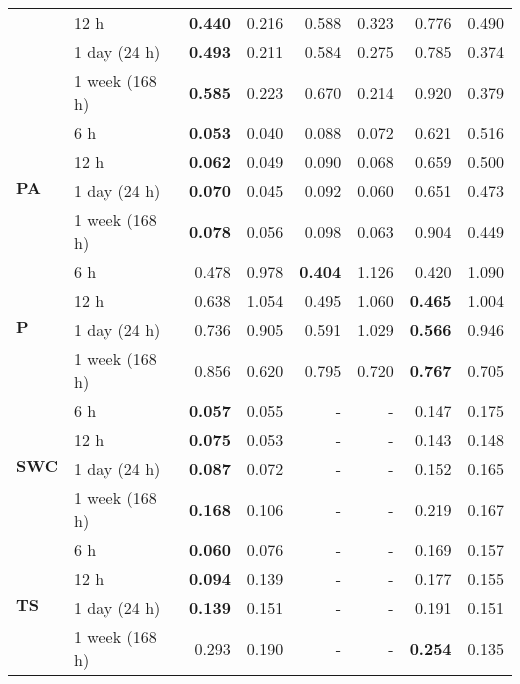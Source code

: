 \begin{table}
\begin{tabular}{p{2.1cm}l|rr|rr|rr}
 & 12 h & \bfseries 0.440 & 0.216 & 0.588 & 0.323 & 0.776 & 0.490 \\
 & 1 day (24 h) & \bfseries 0.493 & 0.211 & 0.584 & 0.275 & 0.785 & 0.374 \\
 & 1 week (168 h) & \bfseries 0.585 & 0.223 & 0.670 & 0.214 & 0.920 & 0.379 \\
\cline{1-8}
\multirow[c]{4}{*}{\textbf{PA}} & 6 h & \bfseries 0.053 & 0.040 & 0.088 & 0.072 & 0.621 & 0.516 \\
 & 12 h & \bfseries 0.062 & 0.049 & 0.090 & 0.068 & 0.659 & 0.500 \\
 & 1 day (24 h) & \bfseries 0.070 & 0.045 & 0.092 & 0.060 & 0.651 & 0.473 \\
 & 1 week (168 h) & \bfseries 0.078 & 0.056 & 0.098 & 0.063 & 0.904 & 0.449 \\
\cline{1-8}
\multirow[c]{4}{*}{\textbf{P}} & 6 h & 0.478 & 0.978 & \bfseries 0.404 & 1.126 & 0.420 & 1.090 \\
 & 12 h & 0.638 & 1.054 & 0.495 & 1.060 & \bfseries 0.465 & 1.004 \\
 & 1 day (24 h) & 0.736 & 0.905 & 0.591 & 1.029 & \bfseries 0.566 & 0.946 \\
 & 1 week (168 h) & 0.856 & 0.620 & 0.795 & 0.720 & \bfseries 0.767 & 0.705 \\
\cline{1-8}
\multirow[c]{4}{*}{\textbf{SWC}} & 6 h & \bfseries 0.057 & 0.055 & - & - & 0.147 & 0.175 \\
 & 12 h & \bfseries 0.075 & 0.053 & - & - & 0.143 & 0.148 \\
 & 1 day (24 h) & \bfseries 0.087 & 0.072 & - & - & 0.152 & 0.165 \\
 & 1 week (168 h) & \bfseries 0.168 & 0.106 & - & - & 0.219 & 0.167 \\
\cline{1-8}
\multirow[c]{4}{*}{\textbf{TS}} & 6 h & \bfseries 0.060 & 0.076 & - & - & 0.169 & 0.157 \\
 & 12 h & \bfseries 0.094 & 0.139 & - & - & 0.177 & 0.155 \\
 & 1 day (24 h) & \bfseries 0.139 & 0.151 & - & - & 0.191 & 0.151 \\
 & 1 week (168 h) & 0.293 & 0.190 & - & - & \bfseries 0.254 & 0.135 \\
\cline{1-8}
\bottomrule
\end{tabular}
\end{table}
